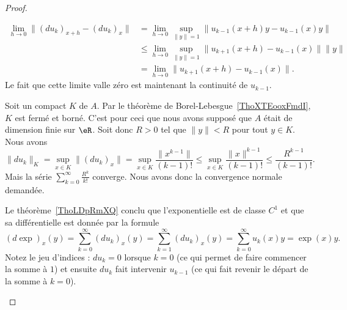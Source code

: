 \begin{proof}
\begin{subproof}
		\begin{subequations}
			\begin{align}
				\lim_{h\to 0} \| (du_k)_{x+h}-(du_k)_x \| & =\lim_{h\to 0} \sup_{\| y \|=1}\| u_{k-1}(x+h)y-u_{k-1}(x)y \|         \\
				                                          & \leq\lim_{h\to 0} \sup_{\| y \|=1}\| u_{k+1}(x+h)-u_{k-1}(x) \|\| y \| \\
				                                          & =\lim_{h\to 0} \| u_{k+1}(x+h)-u_{k-1}(x) \|.
			\end{align}
		\end{subequations}
		Le fait que cette limite valle zéro est maintenant la continuité de \( u_{k-1}\).


		Soit un compact \( K\) de \( A\). Par le théorème de Borel-Lebesgue~\ref{ThoXTEooxFmdI}, \( K\) est fermé et borné. C'est pour ceci que nous avons supposé que \( A\) était de dimension finie sur \( \eR\). Soit donc \( R>0\) tel que \( \| y \|<R\) pour tout \( y\in K\). Nous avons
		\begin{equation}
			\| du_k \|_K=\sup_{x\in K}\| (du_k)_x \|=\sup_{x\in K}\frac{ \| x^{k-1} \| }{ (k-1)! }\leq \sup_{x\in K}\frac{ \| x \|^{k-1} }{ (k-1)! }\leq \frac{ R^{k-1} }{ (k-1)! }.
		\end{equation}
		Mais la série \( \sum_{k=0}^{\infty}\frac{ R^k }{k!}\) converge. Nous avons donc la convergence normale demandée.

		\spitem[Conclusion]

		Le théorème~\ref{ThoLDpRmXQ} conclu que l'exponentielle est de classe \( C^1\) et que sa différentielle est donnée par la formule
		\begin{equation}
			(d\exp)_x(y)=\sum_{k=0}^{\infty}(du_k)_x(y)=\sum_{k=1}^{\infty}(du_k)_x(y)=\sum_{k=0}^{\infty}u_k(x)y=\exp(x)y.
		\end{equation}
		Notez le jeu d'indices : \( du_k=0\) lorsque \( k=0\) (ce qui permet de faire commencer la somme à \( 1\)) et ensuite \( du_k\) fait intervenir \( u_{k-1}\) (ce qui fait revenir le départ de la somme à \( k=0\)).

	\end{subproof}
\end{proof}

